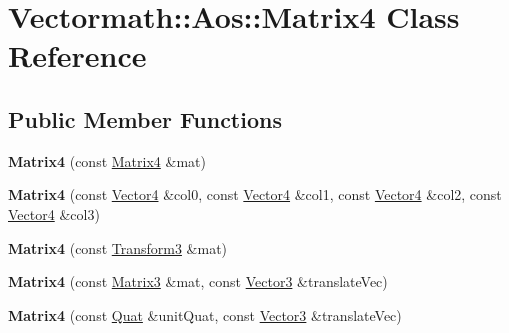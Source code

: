 \hypertarget{classVectormath_1_1Aos_1_1Matrix4}{}\section{Vectormath\+:\+:Aos\+:\+:Matrix4 Class Reference}
\label{classVectormath_1_1Aos_1_1Matrix4}
\subsection*{Public Member Functions}
\begin{DoxyCompactItemize}
\item 
\mbox{\label{classVectormath_1_1Aos_1_1Matrix4_ab1f5a51a2e0d533dd04e1645e9f1f9de}} 
{\bfseries Matrix4} (const \hyperlink{classVectormath_1_1Aos_1_1Matrix4}{Matrix4} \&mat)
\item 
\mbox{\label{classVectormath_1_1Aos_1_1Matrix4_af3386f64d6e060f56a9cc5597d634f83}} 
{\bfseries Matrix4} (const \hyperlink{classVectormath_1_1Aos_1_1Vector4}{Vector4} \&col0, const \hyperlink{classVectormath_1_1Aos_1_1Vector4}{Vector4} \&col1, const \hyperlink{classVectormath_1_1Aos_1_1Vector4}{Vector4} \&col2, const \hyperlink{classVectormath_1_1Aos_1_1Vector4}{Vector4} \&col3)
\item 
\mbox{\label{classVectormath_1_1Aos_1_1Matrix4_a155dbd37559971bfcd30124bf5b66b5b}} 
{\bfseries Matrix4} (const \hyperlink{classVectormath_1_1Aos_1_1Transform3}{Transform3} \&mat)
\item 
\mbox{\label{classVectormath_1_1Aos_1_1Matrix4_a136146577c4e69585bde9e17fd7739fd}} 
{\bfseries Matrix4} (const \hyperlink{classVectormath_1_1Aos_1_1Matrix3}{Matrix3} \&mat, const \hyperlink{classVectormath_1_1Aos_1_1Vector3}{Vector3} \&translate\+Vec)
\item 
\mbox{\label{classVectormath_1_1Aos_1_1Matrix4_ac3baa078bb8fc98ffc65cc32c36c5e6e}} 
{\bfseries Matrix4} (const \hyperlink{classVectormath_1_1Aos_1_1Quat}{Quat} \&unit\+Quat, const \hyperlink{classVectormath_1_1Aos_1_1Vector3}{Vector3} \&translate\+Vec)
\item 
\mbox{\label{classVectormath_1_1Aos_1_1Matrix4_ab38c1cbd9bacd23df03ac5ed70755d2f}} 

\end{DoxyCompactItemize}
